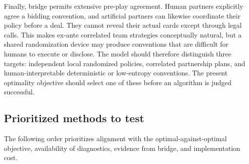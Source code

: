 \documentclass[11pt]{article}
\begin{document}
Finally, bridge permits extensive pre-play agreement. Human partners explicitly agree a bidding convention, and artificial partners can likewise coordinate their policy before a deal. They cannot reveal their actual cards except through legal calls. This makes ex-ante correlated team strategies conceptually natural, but a shared randomization device may produce conventions that are difficult for humans to execute or disclose. The model should therefore distinguish three targets: independent local randomized policies, correlated partnership plans, and human-interpretable deterministic or low-entropy conventions. The present optimality objective should select one of these before an algorithm is judged successful.


\subsection{Prioritized methods to test}

The following order prioritizes alignment with the optimal-against-optimal objective, availability of diagnostics, evidence from bridge, and implementation cost.
\end{document}
